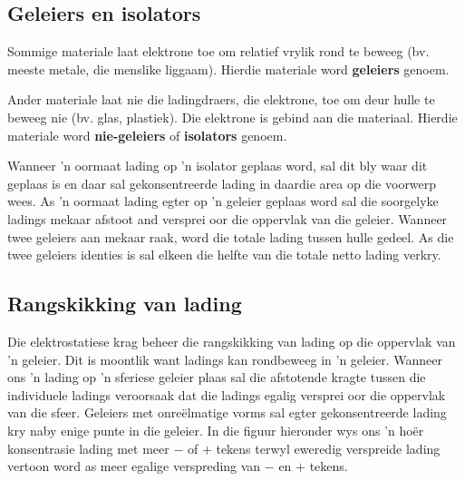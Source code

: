 \subsection*{Geleiers en isolators}
    \nopagebreak

Sommige materiale laat elektrone toe om relatief vrylik rond te beweeg (bv. meeste metale, die menslike liggaam). Hierdie materiale word \textbf{geleiers} genoem. \par

Ander materiale laat nie die ladingdraers, die elektrone, toe om deur hulle te beweeg nie (bv. glas, plastiek). Die elektrone is gebind aan die materiaal. Hierdie materiale word \textbf{nie-geleiers} of \textbf{isolators} genoem. \par

Wanneer 'n oormaat lading op 'n isolator geplaas word, sal dit bly waar dit geplaas is en daar sal gekonsentreerde lading in daardie area op die voorwerp wees. As 'n oormaat lading egter op 'n geleier geplaas word sal die soorgelyke ladings mekaar afstoot and versprei oor die oppervlak van die geleier. Wanneer twee geleiers aan mekaar raak, word die totale lading tussen hulle gedeel. As die twee geleiers identies is sal elkeen die helfte van die totale netto lading verkry. \par

\subsection*{Rangskikking van lading}

Die elektrostatiese krag beheer die rangskikking van lading op die oppervlak van 'n geleier. Dit is moontlik want ladings kan rondbeweeg in 'n geleier. Wanneer ons 'n lading op 'n sferiese geleier plaas sal die afstotende kragte tussen die individuele ladings veroorsaak dat die ladings egalig versprei oor die oppervlak van die sfeer. Geleiers met onre\"elmatige vorms sal egter gekonsentreerde lading kry naby enige punte in die geleier. In die figuur hieronder wys ons 'n ho\"er konsentrasie lading met meer $-$ of $+$ tekens terwyl eweredig verspreide lading vertoon word as meer egalige verspreding van $-$ en $+$ tekens.\par

